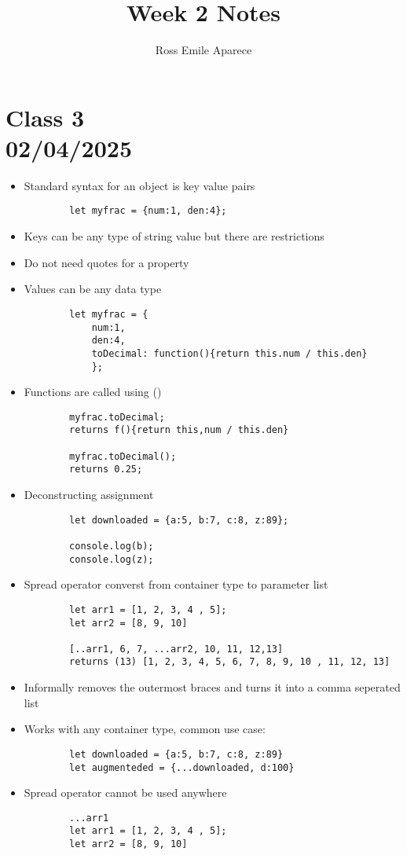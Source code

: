 \documentclass{article}
\title{Week 2 Notes}
\date{}
\author{Ross Emile Aparece}
\begin{document}
\maketitle

\section*{Class 3 \\ 02/04/2025}\label{sec:Class 3}
\begin{itemize}
    \item Standard syntax for an object is key value pairs
    \begin{lstlisting}
        let myfrac = {num:1, den:4};
    \end{lstlisting}
    \item Keys can be any type of string value but there are restrictions
    \item Do not need quotes for a property
    \item Values can be any data type
    \begin{lstlisting}
        let myfrac = {
            num:1, 
            den:4, 
            toDecimal: function(){return this.num / this.den}
            };
    \end{lstlisting}
    \item Functions are called using ()
    \begin{lstlisting}
        myfrac.toDecimal;
        returns f(){return this,num / this.den}

        myfrac.toDecimal();
        returns 0.25;
    \end{lstlisting}
    \item Deconstructing assignment
    \begin{lstlisting}
        let downloaded = {a:5, b:7, c:8, z:89};

        console.log(b);
        console.log(z);
    \end{lstlisting}
    \item Spread operator converst from container type to parameter list
    \begin{lstlisting}
        let arr1 = [1, 2, 3, 4 , 5];
        let arr2 = [8, 9, 10]

        [..arr1, 6, 7, ...arr2, 10, 11, 12,13]
        returns (13) [1, 2, 3, 4, 5, 6, 7, 8, 9, 10 , 11, 12, 13]
    \end{lstlisting}
    \item Informally removes the outermost braces and turns it into a comma seperated list
    \item Works with any container type, common use case:
    \begin{lstlisting}
        let downloaded = {a:5, b:7, c:8, z:89}
        let augmenteded = {...downloaded, d:100}
    \end{lstlisting}
    \item Spread operator cannot be used anywhere
    \begin{lstlisting}
        ...arr1 
        let arr1 = [1, 2, 3, 4 , 5];
        let arr2 = [8, 9, 10]


\end{lstlisting}
\end{itemize}
\end{document}
